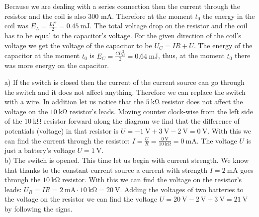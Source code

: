 \documentclass[11pt]{article}
\begin{document}

\solueng
Because we are dealing with a series connection then the current through the resistor and the coil is also 300 mA. Therefore at the moment $t_0$ the energy in the coil was $E_L=\frac{LI^2}{2}=\SI{0.45}{\milli\joule}$. The total voltage drop on the resistor and the coil has to be equal to the capacitor’s voltage. For the given direction of the coil’s voltage we get the voltage of the capacitor to be $U_C=IR+U$. The energy of the capacitor at the moment $t_0$ is $E_C=\frac{CU_C^2}{2}=\SI{0.64}{\milli\joule}$, thus, at the moment $t_0$ there was more energy on the capacitor.
\probend
\bigskip


\solueng
a) If the switch is closed then the current of the current source can go through the switch and it does not affect anything. Therefore we can replace the switch with a wire. In addition let us notice that the $\SI{5}{\kilo\ohm}$ resistor does not affect the voltage on the $\SI{10}{\kilo\ohm}$ resistor’s leads.  Moving counter clock-wise from the left side of the $\SI{10}{\kilo\ohm}$ resistor forward along the diagram we find that the difference of potentials (voltage) in that resistor is $U = -\SI{1}{\volt} + \SI{3}{\volt} - \SI{2}{\volt} = \SI{0}{\volt}$. With this we can find the current through the resistor: $I = \frac U R = \frac {\SI{0}{\volt}} {\SI{10}{\kilo\ohm}} = \SI{0}{\milli\ampere}$. The voltage $U$ is just a battery’s voltage $U=\SI{1}{\volt}$.\\
b) The switch is opened. This time let us begin with current strength. We know that thanks to the constant current source a current with strength $I = \SI{2}{\milli\ampere}$ goes through the $\SI{10}{\kilo\ohm}$ resistor. With this we can find the voltage on the resistor’s leads: $U_R = IR = \SI{2}{\milli\ampere} \cdot \SI{10}{\kilo\ohm} = \SI{20}{\volt}$. Adding the voltages of two batteries to the voltage on the resistor we can find the voltage $U = \SI{20}{\volt} - \SI{2}{\volt} + \SI{3}{\volt} = \SI{21}{\volt}$ by following the signs.
\probend
\bigskip

\end{document}
